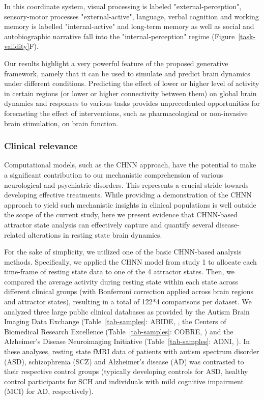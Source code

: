 \documentclass{article}
\begin{document}
In this coordinate system, visual processing is labeled "external-perception", sensory-motor processes
"external-active", language, verbal cognition and working memory is labelled "internal-active" and long-term memory
as well as social and autobiographic narrative fall into the "internal-perception" regime (Figure~\ref{task-validity}F).

Our results highlight a very powerful feature of the proposed generative framework, namely that it can be used to
simulate and predict brain dynamics under different conditions. Predicting the effect of lower or higher level of
activity in certain regions (or lower or higher connectivity between them) on global brain dynamics and responses to
various tasks provides unprecedented opportunities for forecasting the effect of interventions, such as pharmacological
or non-invasive brain stimulation, on brain function.

\subsubsection{Clinical relevance}\label{Clinical relevance}

Computational models, such as the CHNN approach, have the potential to make a significant contribution to our mechanistic comprehension of various neurological and psychiatric disorders. This represents a crucial stride towards developing effective treatments. While providing a demonstration of the CHNN approach to yield such mechanistic insights in clinical populations is well outside the scope of the current study, here we present evidence that CHNN-based attractor state analysis can effectively capture and quantify several disease-related alterations in resting state brain dynamics.

For the sake of simplicity, we utilized one of the basic CHNN-based analysis methods. Specifically, we applied the CHNN model from study 1 to allocate each time-frame of resting state data to one of the 4 attractor states. Then, we compared the average activity during resting state within each state across different clinical groups (with Bonferroni correction applied across brain regions and attractor states), resulting in a total of 122*4 comparisons per dataset. We analyzed three large public clinical databases as provided by the Autism Brain Imaging Data Exchange
(Table~\ref{tab-samples}: ABIDE, \citep{di2014autism}, the Centers of Biomedical Research Excellence
(Table~\ref{tab-samples}: COBRE, \citep{aine2017multimodal}) and the Alzheimer's Disease Neuroimaging Initiative
(Table~\ref{tab-samples}: ADNI, \citep{petersen2010alzheimer}).
In these analyses, resting state fMRI data of patients with autism spectrum disorder (ASD), schizophrenia (SCZ) and Alzheimer's disease
(AD) was contrasted to their respective control groups (typically developing controls for ASD, healthy control
participants for SCH and individuals with mild cognitive impairment (MCI) for AD, respectively).
\end{document}

